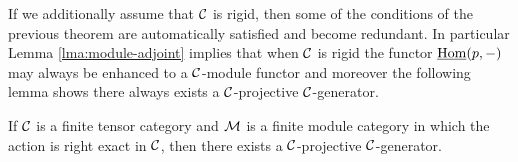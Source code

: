 \documentclass{amsart}
\begin{document}

If we additionally assume that $\mathcal C$ is rigid, then some of the conditions of the previous theorem are automatically satisfied and become redundant. In particular Lemma \ref{lma:module-adjoint} implies that when $\mathcal C$ is rigid the functor $\operatorname{\underline{Hom}}(p,-)$ may always be enhanced to a $\mathcal C$-module functor and moreover the following lemma shows there always exists a $\mathcal C$-projective $\mathcal C$-generator.  
\begin{lemma}{\cite[\S 2.11]{EGNO}} \label{lma:Enough_C-projs}
	If $\mathcal C$ is a finite tensor category and $\mathcal M$ is a finite module category in which the action is right exact in $\mathcal C$, then there exists a $\mathcal C$-projective $\mathcal C$-generator. 
\end{lemma}    
\end{document}
